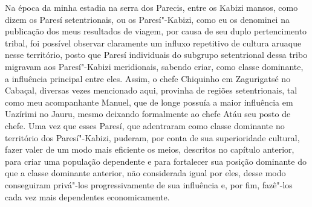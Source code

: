 Na época da minha estadia na serra dos Parecis, entre os Kabizi mansos,
como dizem os Paresí setentrionais, ou os Paresí"-Kabizi, como eu os
denominei na publicação dos meus resultados de viagem, por causa de seu
duplo pertencimento tribal, foi possível observar claramente um influxo
repetitivo de cultura aruaque nesse território, posto que Paresí
individuais do subgrupo setentrional dessa tribo migravam aos
Paresí"-Kabizi meridionais, sabendo criar, como classe dominante, a
influência principal entre eles. Assim, o chefe Chiquinho em Zagurigatsé
no Cabaçal, diversas vezes mencionado aqui, provinha de regiões
setentrionais, tal como meu acompanhante Manuel, que de longe possuía a
maior influência em Uazírimi no Jauru, mesmo deixando formalmente ao
chefe Atáu seu posto de chefe. Uma vez que esses Paresí, que adentraram
como classe dominante no território dos Paresí"-Kabizi, puderam, por
conta de sua superioridade cultural, fazer valer de um modo mais
eficiente os meios, descritos no capítulo anterior, para criar uma
população dependente e para fortalecer sua posição dominante do que a
classe dominante anterior, não considerada igual por eles, desse modo
conseguiram privá"-los progressivamente de sua influência e, por fim,
fazê"-los cada vez mais dependentes economicamente. 

